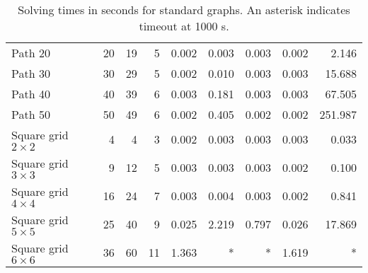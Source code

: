 \begin{table}[htb]
\begin{tabular}{l r r r r r r r r}
Path 20 & 20 & 19 & 5 & 0.002 & 0.003 & 0.003 & 0.002 & 2.146 \\
Path 30 & 30 & 29 & 5 & 0.002 & 0.010 & 0.003 & 0.003 & 15.688 \\
Path 40 & 40 & 39 & 6 & 0.003 & 0.181 & 0.003 & 0.003 & 67.505 \\
Path 50 & 50 & 49 & 6 & 0.002 & 0.405 & 0.002 & 0.002 & 251.987 \\
\addlinespace[0.5em]
Square grid $2\times2$ & 4 & 4 & 3 & 0.002 & 0.003 & 0.003 & 0.003 & 0.033 \\
Square grid $3\times3$ & 9 & 12 & 5 & 0.003 & 0.003 & 0.003 & 0.002 & 0.100 \\
Square grid $4\times4$ & 16 & 24 & 7 & 0.003 & 0.004 & 0.003 & 0.002 & 0.841 \\
Square grid $5\times5$ & 25 & 40 & 9 & 0.025 & 2.219 & 0.797 & 0.026 & 17.869 \\
Square grid $6\times6$ & 36 & 60 & 11 & 1.363 & * & * & 1.619 & * \\
 \bottomrule
 \end{tabular}
 \caption{{Solving times in seconds for standard graphs.  An asterisk indicates timeout at 1000 s.}}
 \label{table:standard}
\end{table}
